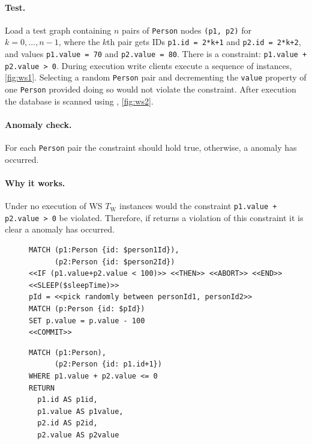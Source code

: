 \paragraph{Test.}
Load a test graph containing $n$ pairs of \texttt{Person} nodes \texttt{(p1, p2)} for $k = 0, \ldots, n-1$, where the $k$th pair gets IDs \texttt{p1.id = 2*k+1} and \texttt{p2.id = 2*k+2}, and values \texttt{p1.value = 70} and \texttt{p2.value = 80}.
There is a constraint: \texttt{p1.value + p2.value > 0}.
During execution write clients execute a sequence of  instances, \autoref{fig:ws1}.
Selecting a random \texttt{Person} pair and decrementing the \texttt{value} property of one \texttt{Person} provided doing so would not violate the constraint.
After execution the database is scanned using , \autoref{fig:ws2}.

\paragraph{Anomaly check.}
For each \texttt{Person} pair the constraint should hold true, otherwise, a  anomaly has occurred.

\paragraph{Why it works.}
Under no  execution of WS $T_\mathrm{W}$ instances would the constraint \texttt{p1.value + p2.value > 0} be violated.
Therefore, if  returns a violation of this constraint it is clear a  anomaly has occurred.

\begin{figure}[htb]
\centering
\begin{minipage}{0.55\linewidth}
\begin{lstlisting}[language=cypher,label=fig:ws1,caption=\tx{WS $T_\mathrm{W}$}.]
MATCH (p1:Person {id: $person1Id}),
      (p2:Person {id: $person2Id})
<<IF (p1.value+p2.value < 100)>> <<THEN>> <<ABORT>> <<END>>
<<SLEEP($sleepTime)>>
pId = <<pick randomly between personId1, personId2>>
MATCH (p:Person {id: $pId})
SET p.value = p.value - 100
<<COMMIT>>
\end{lstlisting}
\end{minipage}
\quad
\begin{minipage}{0.33\linewidth}
\begin{lstlisting}[language=cypher,label=fig:ws2,caption=\tx{WS $T_\mathrm{R}$}.]
MATCH (p1:Person),
      (p2:Person {id: p1.id+1})
WHERE p1.value + p2.value <= 0
RETURN
  p1.id AS p1id,
  p1.value AS p1value,
  p2.id AS p2id,
  p2.value AS p2value
\end{lstlisting}
\end{minipage}
\end{figure}

